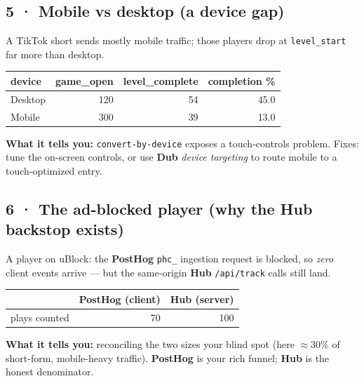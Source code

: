 \documentclass[11pt]{article}
\newcommand{\Dub}{\textcolor{dub}{\textbf{Dub}}}
\newcommand{\PH}{\textcolor{ph}{\textbf{PostHog}}}
\newcommand{\Hub}{\textcolor{hub}{\textbf{Hub}}}
\begin{document}
\subsection{5 · Mobile vs desktop (a device gap)}
A TikTok short sends mostly mobile traffic; those players drop at \texttt{level\_start} far more
than desktop.
\begin{center}\footnotesize
\begin{tabular}{@{}lrrr@{}}
\toprule
device & game\_open & level\_complete & completion \% \\
\midrule
Desktop & 120 & 54 & 45.0 \\
Mobile  & 300 & 39 & 13.0 \\
\bottomrule
\end{tabular}
\end{center}
\textbf{What it tells you:} \texttt{convert-by-device} exposes a touch-controls problem. Fixes:
tune the on-screen controls, or use \Dub{} \emph{device targeting} to route mobile to a
touch-optimized entry.

\subsection{6 · The ad-blocked player (why the Hub backstop exists)}
A player on uBlock: the \PH{} \texttt{phc\_} ingestion request is blocked, so \emph{zero} client
events arrive --- but the same-origin \Hub{} \texttt{/api/track} calls still land.
\begin{center}\footnotesize
\begin{tabular}{@{}lrr@{}}
\toprule
 & \PH{} (client) & \Hub{} (server) \\
\midrule
plays counted & 70 & 100 \\
\bottomrule
\end{tabular}
\end{center}
\textbf{What it tells you:} reconciling the two sizes your blind spot (here $\approx$30\% of
short-form, mobile-heavy traffic). \PH{} is your rich funnel; \Hub{} is the honest denominator.
\end{document}
